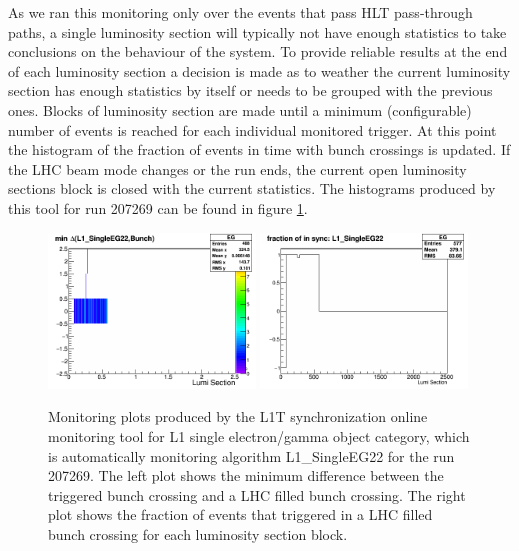 As we ran this monitoring only over the events that pass \gls{HLT} pass-through paths, a single luminosity section will typically not have enough statistics to take conclusions on the behaviour of the system. To provide reliable results at the end of each luminosity section a decision is made as to weather the current luminosity section has enough statistics by itself or needs to be grouped with the previous ones. Blocks of luminosity section are made until a minimum (configurable) number of events is reached for each individual monitored trigger. At this point the histogram of the fraction of events in time with bunch crossings is updated. If the \gls{LHC} beam mode changes or the run ends, the current open luminosity sections block is closed with the current statistics. The histograms produced by this tool for run 207269 can be found in figure \ref{FIGURE:TechnicalWork_SyncMonitoring}.

\begin{figure}[!htb]
\centering
\includegraphics[width=0.49\textwidth]{Chapter03/L1TOnline/Images/L1TDQM_Online_Run207269_L1TSync_AlgoVsBunchStructure_EG.png}
\includegraphics[width=0.49\textwidth]{Chapter03/L1TOnline/Images/L1TDQM_Online_Run207269_L1TSync_Certification_EG.png}
\caption[Monitoring plots produced by the L1T synchronization online monitoring tool for run 207269 and the electron/gamma object category.]
{Monitoring plots produced by the L1T synchronization online monitoring tool for L1 single electron/gamma object category, which is automatically monitoring algorithm L1\_SingleEG22 for the run 207269. The left plot shows the minimum difference between the triggered bunch crossing and a \gls{LHC} filled bunch crossing. The right plot shows the fraction of events that triggered in a \gls{LHC} filled bunch crossing for each luminosity section block.}
\label{FIGURE:TechnicalWork_SyncMonitoring}
\end{figure}

